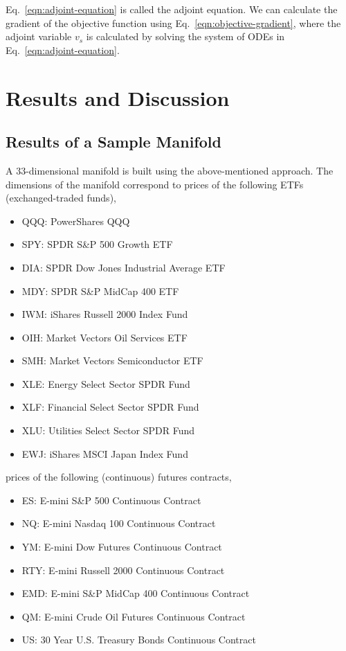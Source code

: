\documentclass{article}
\begin{document}
Eq.~\ref{eqn:adjoint-equation} is called the adjoint equation. We can
calculate the gradient of the objective function using
Eq.~\ref{eqn:objective-gradient}, where the adjoint variable $v_{s}$
is calculated by solving the system of ODEs in
Eq.~\ref{eqn:adjoint-equation}.
  
\section{Results and Discussion}\label{section:results-discussion}

\subsection{Results of a Sample Manifold}\label{subsection:some-results}

A 33-dimensional manifold is built using the above-mentioned
approach. The dimensions of the manifold correspond to prices of the
following ETFs (exchanged-traded funds),

\begin{itemize}
    \item[] QQQ: PowerShares QQQ 
    \item[] SPY: SPDR S\&P 500 Growth ETF 
    \item[] DIA: SPDR Dow Jones Industrial Average ETF 
    \item[] MDY: SPDR S\&P MidCap 400 ETF 
    \item[] IWM: iShares Russell 2000 Index Fund 
    \item[] OIH: Market Vectors Oil Services ETF 
    \item[] SMH: Market Vectors Semiconductor ETF 
    \item[] XLE: Energy Select Sector SPDR Fund 
    \item[] XLF: Financial Select Sector SPDR Fund 
    \item[] XLU: Utilities Select Sector SPDR Fund 
    \item[] EWJ: iShares MSCI Japan Index Fund
\end{itemize}

prices of the following (continuous) futures contracts,

\begin{itemize}
    \item[] ES:  E-mini S\&P 500 Continuous Contract 
    \item[] NQ:  E-mini Nasdaq 100 Continuous Contract 
    \item[] YM:  E-mini Dow Futures Continuous Contract 
    \item[] RTY: E-mini Russell 2000 Continuous Contract 
    \item[] EMD: E-mini S\&P MidCap 400 Continuous Contract 
    \item[] QM:  E-mini Crude Oil Futures Continuous Contract 
    \item[] US:  30 Year U.S. Treasury Bonds Continuous Contract    
\end{itemize}
\end{document}
